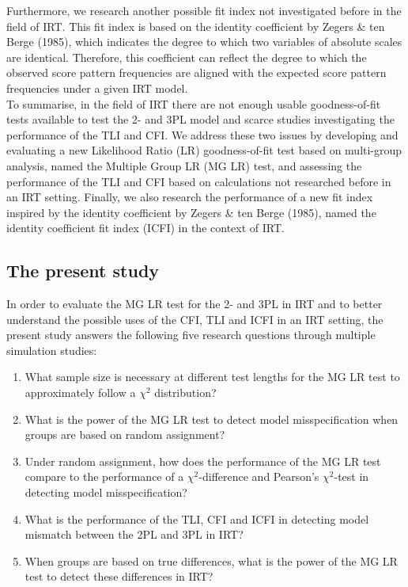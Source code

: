 \documentclass[Royal,sageapa,times,doublespace]{sagej}
\begin{document}
\indent Furthermore, we research another possible fit index not investigated before in the field of IRT. This fit index is based on the identity coefficient by Zegers \& ten Berge (1985), which indicates the degree to which two variables of absolute scales are identical. Therefore, this coefficient can reflect the degree to which the observed score pattern frequencies are aligned with the expected score pattern frequencies under a given IRT model. \\

\indent To summarise, in the field of IRT there are not enough usable goodness-of-fit tests available to test the 2- and 3PL model and scarce studies investigating the performance of the TLI and CFI. We address these two issues by developing and evaluating a new Likelihood Ratio (LR) goodness-of-fit test based on multi-group analysis, named the Multiple Group LR (MG LR) test, and assessing the performance of the TLI and CFI based on calculations not researched before in an IRT setting. Finally, we also research the performance of a new fit index inspired by the identity coefficient by Zegers \& ten Berge (1985), named the identity coefficient fit index (ICFI) in the context of IRT.

\subsection{The present study}
In order to evaluate the MG LR test for the 2- and 3PL in IRT and to better understand the possible uses of the CFI, TLI  and ICFI in an IRT setting, the present study answers the following five research questions through multiple simulation studies:
\begin{enumerate}
\item{What sample size is necessary at different test lengths for the MG LR test to approximately follow a $\chi^2$ distribution?}
\item{What is the power of the MG LR test to detect model misspecification when groups are based on random assignment?}
\item{Under random assignment, how does the performance of the MG LR test compare to the performance of a $\chi^2$-difference and Pearson's $\chi^2$-test in detecting model misspecification?}
\item{What is the performance of the TLI, CFI and ICFI in detecting model mismatch between the 2PL and 3PL in IRT?}
\item{When groups are based on true differences, what is the power of the MG LR test to detect these differences in IRT?}
\end{enumerate}
\end{document}
